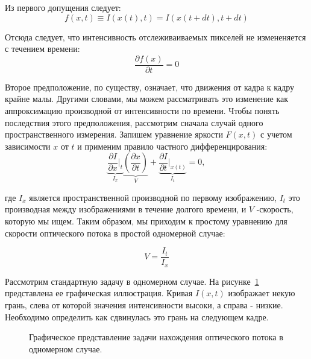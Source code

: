 Из первого допущения следует:
$$
f(x, t) \equiv I(x(t), t) = I(x(t+dt), t + dt)
$$

Отсюда следует, что интенсивность отслеживаиваемых пикселей не измененяется с течением времени:
$$
\frac{\partial f(x)}{\partial t} = 0
$$

Второе предположение, по существу, означает, что движения от кадра к кадру крайне малы. Другими словами, мы можем рассматривать это изменение как аппроксимацию производной от интенсивности по времени. Чтобы понять последствия этого предположения, рассмотрим сначала случай одного пространственного измерения.
Запишем уравнение яркости $F(x,t)$ с учетом зависимости $x$ от $t$ и применим правило частного дифференцирования:
$$
\underbrace{\frac{\partial I }{\partial x} \Bigr|_t}_{I_x} 
\underbrace{\left( \frac{\partial x }{\partial t} \right)}_{V} + 
\underbrace{\frac{\partial I }{\partial t} \Bigr|_{x(t)}}_{I_t} =
 0,
$$

где $I_x$ является пространственной производной по первому изображению, $I_t$ это производная между изображениями в течение долгого времени, и $V$ -скорость, которую мы ищем. Таким образом, мы приходим к простому уравнению для скорости оптического потока в простой одномерной случае:

$$ V = \frac{I_t}{I_x} $$

Рассмотрим стандартную задачу в одномерном случае. На рисунке~\ref{pic:OptFlow1D} представлена ее графическая иллюстрация. Кривая $I(x, t)$ изображает некую грань, слева от которой значения интенсивности высоки, а справа - низкие. Необходимо определить как сдвинулась это грань на следующем кадре. 

\begin{figure}[!htb]
\caption{Графическое представление задачи нахождения оптического потока в одномерном случае.}
\label{pic:OptFlow1D}
\end{figure}

